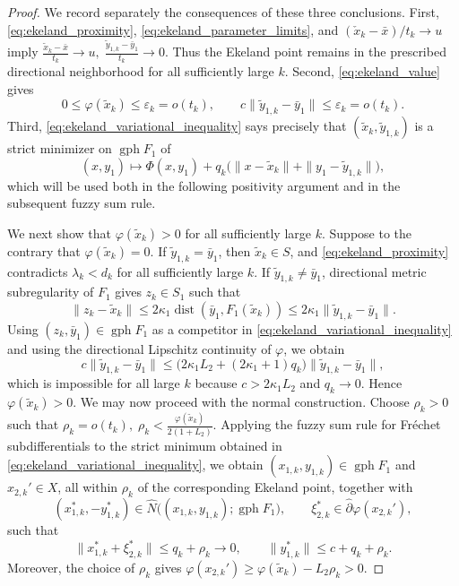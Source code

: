\documentclass[12pt,twoside,reqno]{amsart}
\theoremstyle{definition}
\numberwithin{equation}{section}
\begin{document}
\begin{proof}
We record separately the consequences of these three conclusions. First,
\eqref{eq:ekeland_proximity}, \eqref{eq:ekeland_parameter_limits}, and
$(\check x_k-\bar{x})/t_k\to u$ imply $\frac{\tilde x_k-\bar{x}}{t_k}\to u,\; \frac{\tilde y_{1,k}-\bar{y}_1}{t_k}\to0$. 
Thus the Ekeland point remains in the prescribed directional neighborhood
for all sufficiently large $k$. Second, \eqref{eq:ekeland_value} gives
\begin{equation}\label{eq:ekeland_value_consequences}
    0\le\varphi(\tilde x_k)\le\varepsilon_k=o(t_k),
    \qquad
    c\|\tilde y_{1,k}-\bar{y}_1\|
       \le\varepsilon_k=o(t_k).
\end{equation}
Third, \eqref{eq:ekeland_variational_inequality} says precisely that
$(\tilde x_k,\tilde y_{1,k})$ is a strict minimizer on
$\operatorname{gph}F_1$ of
\[
    (x,y_1)\mapsto
    \Phi(x,y_1)
       +q_k\bigl(\|x-\tilde x_k\|
                  +\|y_1-\tilde y_{1,k}\|\bigr),
\]
which will be used both in the following positivity argument and in the
subsequent fuzzy sum rule.

We next show that $\varphi(\tilde x_k)>0$ for all sufficiently large $k$.
Suppose to the contrary that $\varphi(\tilde x_k)=0$. If
$\tilde y_{1,k}=\bar{y}_1$, then $\tilde x_k\in S$, and
\eqref{eq:ekeland_proximity} contradicts
$\lambda_k<d_k$ for all sufficiently large $k$. If
$\tilde y_{1,k}\ne\bar{y}_1$, directional metric subregularity of $F_1$
gives $z_k\in S_1$ such that
\[
    \|z_k-\tilde x_k\|
    \le2\kappa_1\operatorname{dist}(\bar{y}_1,F_1(\tilde x_k))
    \le2\kappa_1\|\tilde y_{1,k}-\bar{y}_1\|.
\]
Using $(z_k,\bar{y}_1)\in\operatorname{gph}F_1$ as a competitor in
\eqref{eq:ekeland_variational_inequality} and using the directional
Lipschitz continuity of $\varphi$, we obtain
\[
    c\|\tilde y_{1,k}-\bar{y}_1\|
    \le
    \bigl(2\kappa_1L_2+(2\kappa_1+1)q_k\bigr)
    \|\tilde y_{1,k}-\bar{y}_1\|,
\]
which is impossible for all large $k$ because $c>2\kappa_1L_2$ and
$q_k\to0$. Hence $\varphi(\tilde x_k)>0$. 
We may now proceed with the normal construction. Choose $\rho_k>0$ such
that $\rho_k=o(t_k),\;\rho_k<\frac{\varphi(\tilde x_k)}{2(1+L_2)}$. 
Applying the fuzzy sum rule for Fr\'echet subdifferentials
\cite[Theorem~2.33]{Mordukhovich2006variational} to the strict minimum
obtained in \eqref{eq:ekeland_variational_inequality}, we obtain
$(x_{1,k},y_{1,k})\in\operatorname{gph}F_1$ and $x_{2,k}'\in X$, all
within $\rho_k$ of the corresponding Ekeland point, together with
\[
    (x_{1,k}^*,-y_{1,k}^*)\in
    \widehat N\bigl((x_{1,k},y_{1,k});\operatorname{gph}F_1\bigr),
    \qquad
    \xi_{2,k}^*\in\widehat\partial\varphi(x_{2,k}'),
\]
such that
\begin{equation}\label{eq:fuzzy_alignment_limit}
    \|x_{1,k}^*+\xi_{2,k}^*\|
    \le q_k+\rho_k\to0,
    \qquad
    \|y_{1,k}^*\|\le c+q_k+\rho_k.
\end{equation}
Moreover, the choice of $\rho_k$ gives $\varphi(x_{2,k}')
    \ge\varphi(\tilde x_k)-L_2\rho_k>0$. 


\end{proof}
\end{document}
